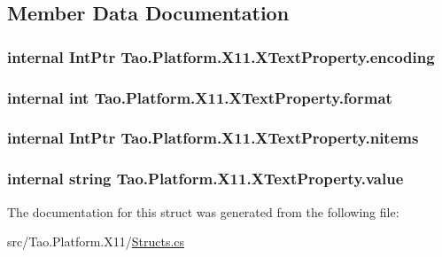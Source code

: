 \subsection{Member Data Documentation}
\hypertarget{struct_tao_1_1_platform_1_1_x11_1_1_x_text_property_ae2342a13abe7e01e61b77aa9bf0887d1}{
\subsubsection[{encoding}]{\setlength{\rightskip}{0pt plus 5cm}internal IntPtr {\bf Tao.Platform.X11.XTextProperty.encoding}}}
\label{struct_tao_1_1_platform_1_1_x11_1_1_x_text_property_ae2342a13abe7e01e61b77aa9bf0887d1}
\hypertarget{struct_tao_1_1_platform_1_1_x11_1_1_x_text_property_a0cc09212f26caf24e5fe37583432e04a}{
\subsubsection[{format}]{\setlength{\rightskip}{0pt plus 5cm}internal int {\bf Tao.Platform.X11.XTextProperty.format}}}
\label{struct_tao_1_1_platform_1_1_x11_1_1_x_text_property_a0cc09212f26caf24e5fe37583432e04a}
\hypertarget{struct_tao_1_1_platform_1_1_x11_1_1_x_text_property_a00039dffc5c1ca02e0683bb103818730}{
\subsubsection[{nitems}]{\setlength{\rightskip}{0pt plus 5cm}internal IntPtr {\bf Tao.Platform.X11.XTextProperty.nitems}}}
\label{struct_tao_1_1_platform_1_1_x11_1_1_x_text_property_a00039dffc5c1ca02e0683bb103818730}
\hypertarget{struct_tao_1_1_platform_1_1_x11_1_1_x_text_property_a745d92c8bfbc59e4b11f9aa4d906069c}{
\subsubsection[{value}]{\setlength{\rightskip}{0pt plus 5cm}internal string {\bf Tao.Platform.X11.XTextProperty.value}}}
\label{struct_tao_1_1_platform_1_1_x11_1_1_x_text_property_a745d92c8bfbc59e4b11f9aa4d906069c}


The documentation for this struct was generated from the following file:\begin{DoxyCompactItemize}
\item 
src/Tao.Platform.X11/\hyperlink{_structs_8cs}{Structs.cs}\end{DoxyCompactItemize}
